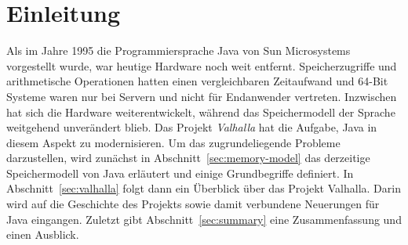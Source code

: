 \section{Einleitung}\label{sec:introduction}

Als im Jahre 1995 die Programmiersprache Java von Sun Microsystems vorgestellt wurde, war heutige Hardware noch weit entfernt.
Speicherzugriffe und arithmetische Operationen hatten einen vergleichbaren Zeitaufwand und 64-Bit Systeme waren nur bei Servern und nicht für Endanwender vertreten.
Inzwischen hat sich die Hardware weiterentwickelt, während das Speichermodell der Sprache weitgehend unverändert blieb.
Das Projekt \emph{Valhalla} hat die Aufgabe, Java in diesem Aspekt zu modernisieren.
Um das zugrundeliegende Probleme darzustellen, wird zunächst in Abschnitt~\ref{sec:memory-model} das derzeitige Speichermodell von Java erläutert und einige Grundbegriffe definiert.
In Abschnitt~\ref{sec:valhalla} folgt dann ein Überblick über das Projekt Valhalla.
Darin wird auf die Geschichte des Projekts sowie damit verbundene Neuerungen für Java eingangen.
Zuletzt gibt Abschnitt~\ref{sec:summary} eine Zusammenfassung und einen Ausblick.
